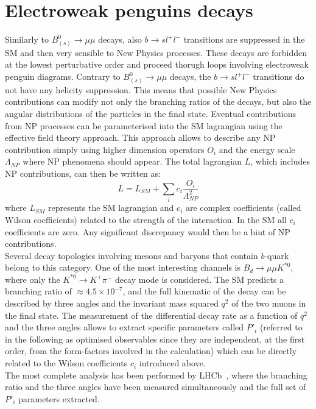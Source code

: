 \documentclass{PoS}
\begin{document}
\section{Electroweak penguins decays}
Similarly to $B^0_{(s)} \to \mu \mu$ decays, also $b \to s l^+ l^-$ transitions are suppressed in the SM and then very sensible to New Physics processes. These decays are forbidden at the lowest perturbative order and proceed thorugh loops involving electroweak penguin diagrams. Contrary to $B^0_{(s)} \to \mu \mu$ decays, the $b \to s l^+ l^-$ transitions do not have any helicity suppression. This means that possible New Physics contributions can modify not only the branching ratios of the decays, but also the angular distributions of the particles in the final state. Eventual contributions from NP processes can be parameterised into the SM lagrangian using the effective field theory approach. This approach allows to describe any NP contribution simply using higher dimension operators $O_i$ and the energy scale $\Lambda_{NP}$ where NP phenomena should appear. The total lagrangian $L$, which includes NP contributions, can then be written as:
\begin{equation}
L = L_{SM}+\sum_i c_i \frac{O_i}{\Lambda^2_{NP}}
\label{eq:wilson}
\end{equation}
where $L_{SM}$ represents the SM lagrangian and $c_i$ are complex coefficients (called Wilson coefficients) related to the strength of the interaction. In the SM all $c_i$ coefficients are zero. Any significant discrepancy would then be a hint of NP contributions.\\
Several decay topologies involving mesons and baryons that contain $b$-quark belong to this category. One of the most interesting channels is $B_d \to \mu \mu K^{*0}$, where only the $K^{*0} \to K^+ \pi^-$ decay mode is considered. The SM predicts a branching ratio of $\approx 4.5 \times 10^{-7}$, and the full kinematic of the decay can be described by three angles and the invariant mass squared $q^2$ of the two muons in the final state. The measurement of the differential decay rate as a function of $q^2$ and the three angles allows to extract specific parameters called $P'_i$ (referred to in the following as optimised observables since they are independent, at the first order, from the form-factors involved in the calculation) which can be directly related to the Wilson coefficients $c_i$ introduced above. \\
The most complete analysis has been performed by LHCb~\cite{mumuK_LHCb}, where the branching ratio and the three angles have been measured simultaneously and the full set of $P'_i$ parameters extracted.
\end{document}
